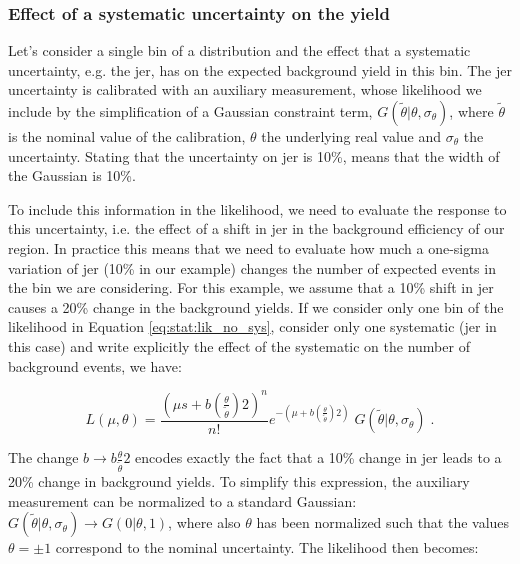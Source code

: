 \subsubsection*{Effect of a systematic uncertainty on the yield}

Let’s consider a single bin of a distribution and the effect that a systematic uncertainty, 
e.g. the \gls{jer}, has on the expected background yield in this bin. 
The \gls{jer} uncertainty is calibrated with an auxiliary measurement, whose likelihood we include by the simplification of a Gaussian constraint term, $G( \tilde{\theta} | \theta, \sigma_\theta)$, where $\tilde{\theta}$ is the nominal value of the calibration, $\theta$ the underlying real value and $\sigma_\theta$ the uncertainty. Stating that the uncertainty on \gls{jer} is 10\%, means that the width of the Gaussian is 10\%. 

To include this information in the likelihood, we need to evaluate the response to this uncertainty, i.e. the effect of a shift in \gls{jer} in the background efficiency of our region.
In practice this means that we need to evaluate how much a one-sigma variation of \gls{jer} (10\% in our example) changes the number of expected events in the bin we are considering. 
For this example, we assume that a 10\% shift in \gls{jer} causes a 20\% change in the background yields.
If we consider only one bin of the likelihood in Equation \ref{eq:stat:lik_no_sys}, consider only one systematic (\gls{jer} in this case) and write explicitly the effect of the systematic on the number of background events, we have:

\begin{equation}
\label{eq:stat:lik_one_bin_sys_pre}
L(\mu, \theta) =
\frac{ (\mu s +
b \left( \frac{\theta}{\tilde{\theta}} \right) 2 )^{n} }{ n! }
e^{- (\mu  + b\left(\frac{\theta}{\tilde{\theta} }\right)2)}   \; 
G( \tilde{\theta} | \theta, \sigma_\theta) \; .
\end{equation}

\noindent The change $b \rightarrow b\frac{\theta}{\tilde{\theta} }2$ encodes exactly the fact that a 10\% change in \gls{jer} leads to a 20\% change in background yields. To simplify this expression, the auxiliary measurement can be normalized to a standard Gaussian: $G( \tilde{\theta} | \theta, \sigma_\theta) \rightarrow G( 0 | \theta, 1)$, where also $\theta$ has been normalized such that the values $\theta = \pm 1$ correspond to the nominal uncertainty. The likelihood then becomes:


